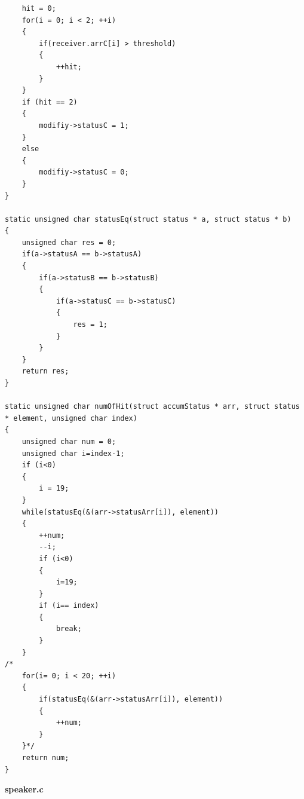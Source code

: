 \documentclass[12pt]{article}
\begin{document}
\begin{lstlisting}
    hit = 0;
    for(i = 0; i < 2; ++i)
    {
        if(receiver.arrC[i] > threshold)
        {
            ++hit;
        }
    }
    if (hit == 2)
    {
        modifiy->statusC = 1;
    }
    else
    {
        modifiy->statusC = 0;
    }
}

static unsigned char statusEq(struct status * a, struct status * b)
{
    unsigned char res = 0;
    if(a->statusA == b->statusA)
    {
        if(a->statusB == b->statusB)
        {
            if(a->statusC == b->statusC)
            {
                res = 1;
            }
        }
    }
    return res;
}

static unsigned char numOfHit(struct accumStatus * arr, struct status * element, unsigned char index)
{
    unsigned char num = 0;
    unsigned char i=index-1;
    if (i<0)
    {
        i = 19;
    }
    while(statusEq(&(arr->statusArr[i]), element))
    {
        ++num;
        --i;
        if (i<0)
        {
            i=19;
        }
        if (i== index)
        {
            break;
        }
    }
/*
    for(i= 0; i < 20; ++i)
    {
        if(statusEq(&(arr->statusArr[i]), element))
        {
            ++num;
        }
    }*/
    return num;
}
\end{lstlisting}

\textbf{speaker.c}
\end{document}
